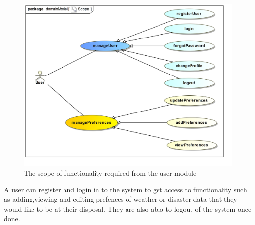 
\begin{figure}[H]
	\centering
	\includegraphics[width=1.0\textwidth]{../images/funcReq/UserScope.jpg}
	\caption{The scope of functionality required from the user module \label{overflow}}
\end{figure}

A user can register and login in to the system to get access to functionality such as adding,viewing and editing prefences of weather or disaster data that they would like to be at their disposal. They are also ablo to logout of the system once done.